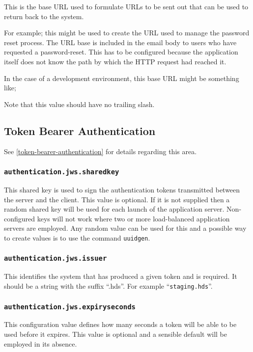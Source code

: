 This is the base URL used to formulate URLs to be sent out that can be used to return back to the system.

For example; this might be used to create the URL used to manage the password reset process.  The URL base is included in the email body to users who have requested a password-reset.  This has to be configured because the application itself does not know the path by which the HTTP request had reached it.

In the case of a development environment, this base URL might be something like;


Note that this value should have no trailing slash.

\subsection{Token Bearer Authentication}

See \ref{token-bearer-authentication} for details regarding this area.

\subsubsection{\tt authentication.jws.sharedkey}

This shared key is used to sign the authentication tokens transmitted between the server and the client.  This value is optional.  If it is not supplied then a random shared key will be used for each launch of the application server.  Non-configured keys will not work where two or more load-balanced application servers are employed.  Any random value can be used for this and a possible way to create values is to use the command {\tt uuidgen}.

\subsubsection{\tt authentication.jws.issuer}

This identifies the system that has produced a given token and is required.  It should be a string with the suffix ``.hds''.  For example ``{\tt staging.hds}''.

\subsubsection{\tt authentication.jws.expiryseconds}

This configuration value defines how many seconds a token will be able to be used before it expires.  This value is optional and a sensible default will be employed in its absence.

